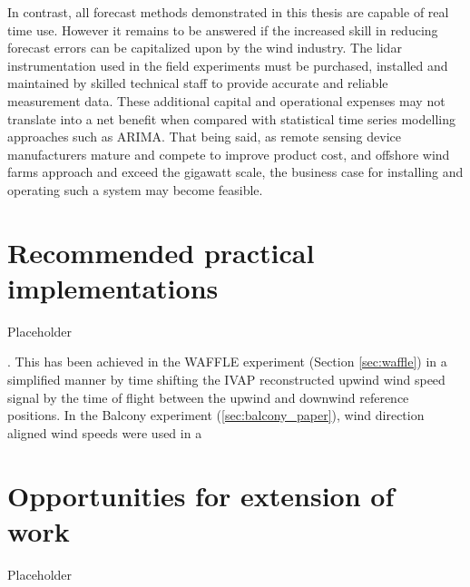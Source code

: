 In contrast, all forecast methods demonstrated in this thesis are capable of real time use. However it remains to be answered if the increased skill in reducing forecast errors can be capitalized upon by the wind industry. The lidar instrumentation used in the field experiments must be purchased, installed and maintained by skilled technical staff to provide accurate and reliable measurement data. These additional capital and operational expenses may not translate into a net benefit when compared with statistical time series modelling approaches such as ARIMA. That being said, as remote sensing device manufacturers mature and compete to improve product cost, and offshore wind farms approach and exceed the gigawatt scale, the business case for installing and operating such a system may become feasible.

\clearpage
\section{Recommended practical implementations}
\label{sec:discussion_practical}

Placeholder

. This has been achieved in the WAFFLE experiment (Section \ref{sec:waffle}) in a simplified manner by time shifting the IVAP reconstructed upwind wind speed signal by the time of flight between the upwind and downwind reference positions. In the Balcony experiment (\ref{sec:balcony_paper}), wind direction aligned wind speeds were used in a 

\begin{comment}

•	Strongest EDFA and laser source in order to get best data availability
•	Smart filtering steps to avoid data loss
•	Hybrid solution which can fall back to persistence if something goes wrong
•	Identify highly local events which can provide the most benefit to forecast
•	Use offshore, mounted on substation, etc.
•	Measure at zero elevation angle

\end{comment}


\clearpage
\section{Opportunities for extension of work}
\label{sec:discussion_extension}

Placeholder

\begin{comment}
•	Probabilistic output
•	Explore uncertainties
•	Use longer range systems
•	Combine data set with wind farm SCADA for control possibilities
Track the wind with lidar scan, fit on the fly
Volumetric wind field tracking
\end{comment}